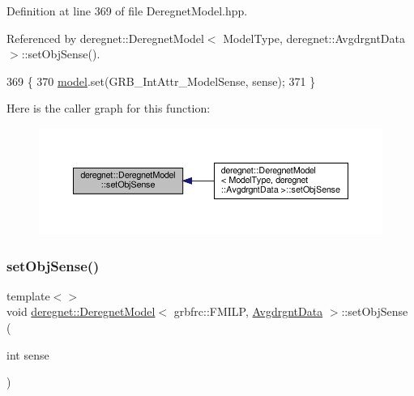 Definition at line 369 of file Deregnet\+Model.\+hpp.



Referenced by deregnet\+::\+Deregnet\+Model$<$ Model\+Type, deregnet\+::\+Avgdrgnt\+Data $>$\+::set\+Obj\+Sense().


\begin{DoxyCode}
369                                                       \{
370     \hyperlink{classderegnet_1_1DeregnetModel_a30d525de2086e342b33fe3e45ede4947}{model}.set(GRB\_IntAttr\_ModelSense, sense);
371 \}
\end{DoxyCode}
Here is the caller graph for this function\+:\nopagebreak
\begin{figure}[H]
\begin{center}
\leavevmode
\includegraphics[width=350pt]{classderegnet_1_1DeregnetModel_adf44f15b2e57acc52c0ba9cca134b33e_icgraph}
\end{center}
\end{figure}
\mbox{\label{classderegnet_1_1DeregnetModel_a903aeabb989a5138f22ccb99198852da}} 
\subsubsection{\texorpdfstring{set\+Obj\+Sense()}{setObjSense()}\hspace{0.1cm}{\footnotesize\ttfamily [2/2]}}
{\footnotesize\ttfamily template$<$$>$ \\
void \hyperlink{classderegnet_1_1DeregnetModel}{deregnet\+::\+Deregnet\+Model}$<$ grbfrc\+::\+F\+M\+I\+LP, \hyperlink{classderegnet_1_1AvgdrgntData}{Avgdrgnt\+Data} $>$\+::set\+Obj\+Sense (\begin{DoxyParamCaption}\item[{int}]{sense }\end{DoxyParamCaption})\hspace{0.3cm}{\ttfamily [inline]}}




